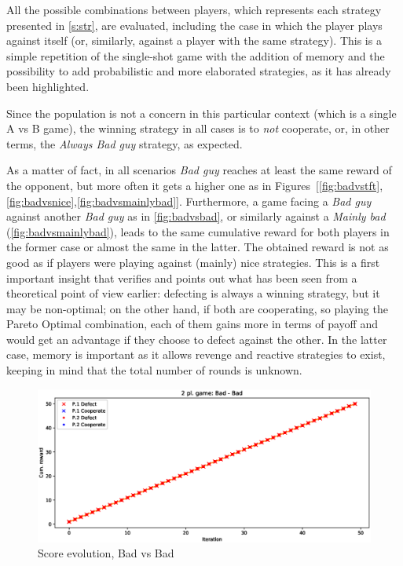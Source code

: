 \documentclass[journal,10pt,twoside]{IEEEtran}
\begin{document}
All the possible combinations between players, which represents each strategy presented in \autoref{s:str}, are evaluated, including the case in which the player plays against itself (or, similarly, against a player with the same strategy).
This is a simple repetition of the single-shot game with the addition of memory and the possibility to add probabilistic and more elaborated strategies, as it has already been highlighted.

Since the population is not a concern in this particular context (which is a single A vs B game), the winning strategy in all cases is to \textit{not} cooperate, or, in other terms, the \textit{Always Bad guy} strategy, as expected.

As a matter of fact, in all scenarios \textit{Bad guy} reaches at least the same reward of the opponent, but more often it gets a higher one as in Figures~[\ref{fig:badvstft},\ref{fig:badvsnice},\ref{fig:badvsmainlybad}]. 
Furthermore, a game facing a \textit{Bad guy} against another \textit{Bad guy} as in \autoref{fig:badvsbad}, or similarly against a \textit{Mainly bad} (\autoref{fig:badvsmainlybad}), leads to the same cumulative reward for both players in the former case or almost the same in the latter. The obtained reward is not as good as if players were playing against (mainly) nice strategies.
This is a first important insight that verifies and points out what has been seen from a theoretical point of view earlier: defecting is always a winning strategy, but it may be non-optimal; on the other hand, if both are cooperating, so playing the Pareto Optimal combination, each of them gains more in terms of payoff and would get an advantage if they choose to defect against the other. In the latter case, memory is important as it allows revenge and reactive strategies to exist, keeping in mind that the total number of rounds is unknown. 

\begin{figure}[!ht]
    \centering
    \includegraphics[width=.9\columnwidth]{../img/ipd2p/ipd2p-rewards-Bad-Bad}
    \caption{Score evolution, Bad vs Bad}
    \label{fig:badvsbad}
\end{figure}
\end{document}
